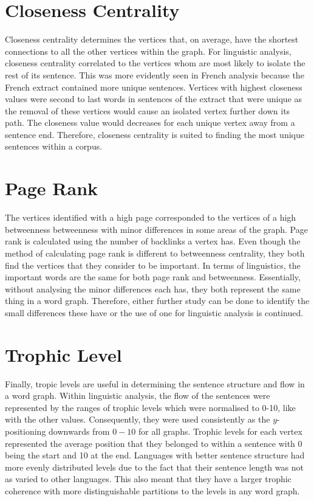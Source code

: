 \section{Closeness Centrality}
Closeness centrality determines the vertices that, on average, have the shortest connections to all the other vertices within the graph. For linguistic analysis, closeness centrality correlated to the vertices whom are most likely to isolate the rest of its sentence. This was more evidently seen in French analysis because the French extract contained more unique sentences. Vertices with highest closeness values were second to last words in sentences of the extract that were unique as the removal of these vertices would cause an isolated vertex further down its path. The closeness value would decreases for each unique vertex away from a sentence end. Therefore, closeness centrality is suited to finding the most unique sentences within a corpus.

\section{Page Rank}
The vertices identified with a high page corresponded to the vertices of a high betweenness betweenness with minor differences in some areas of the graph. Page rank is calculated using the number of backlinks a vertex has. Even though the method of calculating page rank is different to betweenness centrality, they both find the vertices that they consider to be important. In terms of linguistics, the important words are the same for both page rank and betweenness. Essentially, without analysing the minor differences each has, they both represent the same thing in a word graph. Therefore, either further study can be done to identify the small differences these have or the use of one for linguistic analysis is continued.

\section{Trophic Level}
Finally, tropic levels are useful in determining the sentence structure and flow in a word graph. Within linguistic analysis, the flow of the sentences were represented by the ranges of trophic levels which were normalised to 0-10, like with the other values. Consequently, they were used consistently as the $y$-positioning downwards from $0-10$ for all graphs. Trophic levels for each vertex represented the average position that they belonged to within a sentence with 0 being the start and 10 at the end. Languages with better sentence structure had more evenly distributed levels due to the fact that their sentence length was not as varied to other languages. This also meant that they have a larger trophic coherence with more distinguishable partitions to the levels in any word graph.

